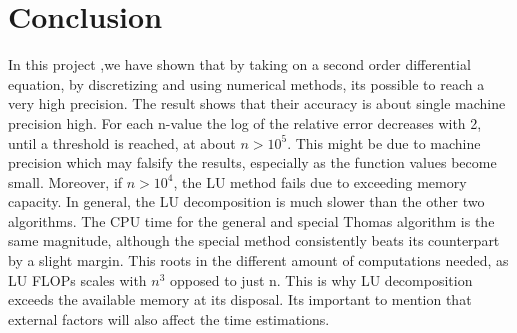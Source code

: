 \documentclass[%
oneside,                 %
final,                   %
10pt]{article}
\begin{document}
\section*{Conclusion}
In this project ,we have shown that by taking on a second order differential equation, by discretizing and using numerical methods, its possible to reach a very high precision. The result shows that their accuracy is about single machine precision high.  For each n-value the log of the relative error decreases with 2, until a threshold is reached, at about $n > 10^5$. This might be due to machine precision which may falsify the results, especially as the function values become small.
Moreover, if $n>10^4$, the LU method fails due to exceeding memory capacity. In general, the LU decomposition is much slower than the other two algorithms.
The CPU time for the general and special Thomas algorithm is the same magnitude, although the special method consistently beats its counterpart by a slight margin. This roots in the different amount of computations needed, as LU FLOPs scales with $n^3$ opposed to just n. This is why LU decomposition exceeds the available memory at its disposal. Its important to mention that external factors will also affect the time estimations. 










\end{document}
